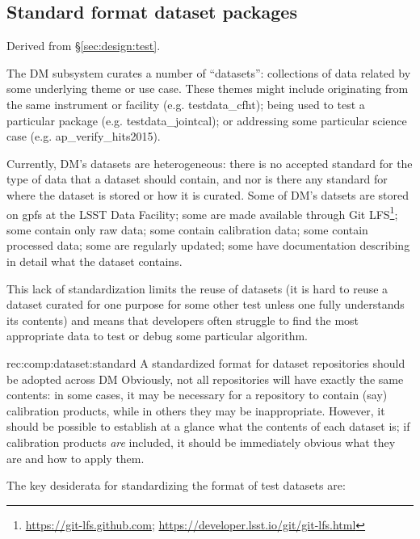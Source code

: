 \subsection{Standard format dataset packages}
\label{sec:comp:dataset}

Derived from \S\ref{sec:design:test}.

The DM subsystem curates a number of ``datasets'': collections of data related by some underlying theme or use case.
These themes might include originating from the same instrument or facility (e.g. testdata\_cfht); being used to test a particular package (e.g. testdata\_jointcal); or addressing some particular science case (e.g. ap\_verify\_hits2015).

Currently, DM's datasets are heterogeneous: there is no accepted standard for the type of data that a dataset should contain, and nor is there any standard for where the dataset is stored or how it is curated.
Some of DM's datsets are stored on \gls{gpfs} at the LSST Data Facility; some are made available through Git LFS\footnote{\url{https://git-lfs.github.com}; \url{https://developer.lsst.io/git/git-lfs.html}}; some contain only raw data; some contain calibration data; some contain processed data; some are regularly updated; some have documentation describing in detail what the dataset contains.

This lack of standardization limits the reuse of datasets (it is hard to reuse a dataset curated for one purpose for some other test unless one fully understands its contents) and means that developers often struggle to find the most appropriate data to test or debug some particular algorithm.

\begin{recommendation}
    {rec:comp:dataset:standard}
    {A standardized format for dataset repositories should be adopted across DM}
Obviously, not all repositories will have exactly the same contents: in some cases, it may be necessary for a repository to contain (say) calibration products, while in others they may be inappropriate.
However, it should be possible to establish at a glance what the contents of each dataset is; if calibration products \emph{are} included, it should be immediately obvious what they are and how to apply them.
\end{recommendation}

The key desiderata for standardizing the format of test datasets are:


